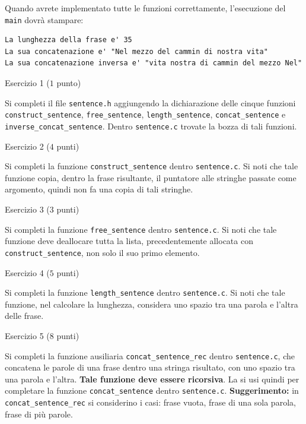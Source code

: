 \documentclass[12pt]{article}
\begin{document}
\noindent
Quando avrete implementato tutte le funzioni correttamente,
l'esecuzione del \texttt{main} dovr\`a stampare:

\begin{mdframed}[backgroundcolor=verylightgray]
\begin{verbatim}
La lunghezza della frase e' 35
La sua concatenazione e' "Nel mezzo del cammin di nostra vita"
La sua concatenazione inversa e' "vita nostra di cammin del mezzo Nel"
\end{verbatim}
\end{mdframed}

\vspace*{1ex}
\begin{center}{\Large Esercizio 1} ($1$ punto)\end{center}
Si completi il file \texttt{sentence.h} aggiungendo la dichiarazione delle cinque funzioni
\texttt{construct\_sentence}, \texttt{free\_sentence},
\texttt{length\_sentence}, \texttt{concat\_sentence} e
\texttt{inverse\_concat\_sentence}. Dentro \texttt{sentence.c} trovate
la bozza di tali funzioni.

\vspace*{1ex}
\begin{center}{\Large Esercizio 2} ($4$ punti)\end{center}
Si completi la funzione \texttt{construct\_sentence} dentro \texttt{sentence.c}.
Si noti che tale funzione copia, dentro la
frase risultante, il puntatore alle stringhe passate come argomento, quindi
non fa una copia di tali stringhe.

\vspace*{1ex}
\begin{center}{\Large Esercizio 3} ($3$ punti)\end{center}
Si completi la funzione \texttt{free\_sentence} dentro \texttt{sentence.c}.
Si noti che tale funzione deve deallocare tutta la lista, precedentemente allocata
con \texttt{construct\_sentence}, non solo il suo primo elemento.

\vspace*{1ex}
\begin{center}{\Large Esercizio 4} ($5$ punti)\end{center}
Si completi la funzione \texttt{length\_sentence} dentro \texttt{sentence.c}.
Si noti che tale funzione, nel calcolare la lunghezza,
considera uno spazio tra una parola e l'altra delle frase.

\vspace*{1ex}
\begin{center}{\Large Esercizio 5} ($8$ punti)\end{center}
Si completi la funzione ausiliaria \texttt{concat\_sentence\_rec} dentro \texttt{sentence.c},
che concatena le parole di una frase dentro una stringa risultato, con uno spazio tra una
parola e l'altra. \textbf{Tale funzione deve essere ricorsiva}. La si usi quindi per
completare la funzione \texttt{concat\_sentence} dentro \texttt{sentence.c}.
\textbf{Suggerimento:} in \texttt{concat\_sentence\_rec} si considerino i casi:
frase vuota, frase di una sola parola, frase di pi\`u parole.
\end{document}
